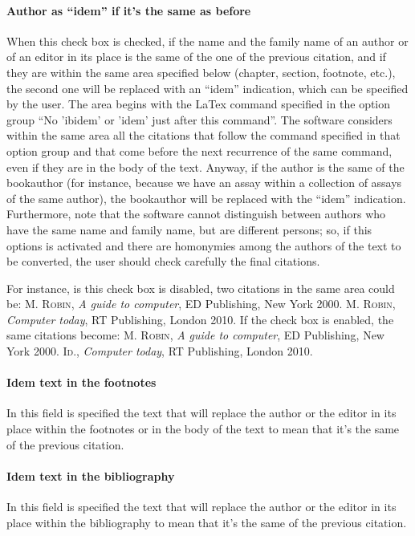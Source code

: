 \documentclass[a4paper,12pt]{report}
\begin{document}
\paragraph{Author as “idem” if it's the same as before} When this check box is checked, if the name and the family name of an author or of an editor in its place is the same of the one of the previous citation, and if they are within the same area specified below (chapter, section, footnote, etc.), the second one will be replaced with an “idem” indication, which can be specified by the user. The area begins with the LaTex command specified in the option group “No 'ibidem' or 'idem' just after this command”. The software considers within the same area all the citations that follow the command specified in that option group and that come before the next recurrence of the same command, even if they are in the body of the text. Anyway, if the author is the same of the bookauthor (for instance, because we have an assay within a collection of assays of the same author), the bookauthor will be replaced with the “idem” indication. Furthermore, note that the software cannot distinguish between authors who have the same name and family name, but are different persons; so, if this options is activated and there are homonymies among the authors of the text to be converted, the user should check carefully the final citations.

\noindent For instance, is this check box is disabled, two citations in the same area could be: \textsc{M. Robin}, \textit{A guide to computer}, ED Publishing, New York 2000. \textsc{M. Robin}, \textit{Computer today}, RT Publishing, London 2010. If the check box is enabled, the same citations become: \textsc{M. Robin}, \textit{A guide to computer}, ED Publishing, New York 2000. \textsc{Id.}, \textit{Computer today}, RT Publishing, London 2010.

\paragraph{Idem text in the footnotes} In this field is specified the text that will replace the author or the editor in its place within the footnotes or in the body of the text to mean that it's the same of the previous citation.

\paragraph{Idem text in the bibliography} In this field is specified the text that will replace the author or the editor in its place within the bibliography to mean that it's the same of the previous citation.
\end{document}
